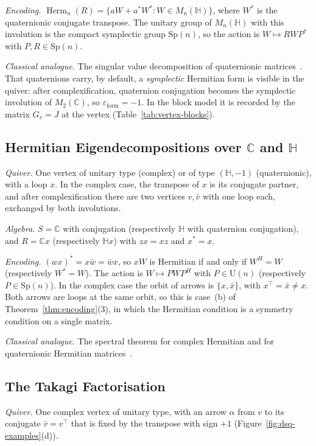 \documentclass[12pt, a4paper]{report}
\theoremstyle{plain}
\theoremstyle{definition}
\theoremstyle{remark}
\theoremstyle{plain}
\newcommand{\epsilonform}{\varepsilon_{\mathrm{form}}}
\newcommand{\CC}{\mathbb{C}}
\newcommand{\HH}{\mathbb{H}}
\newcommand{\Un}{\mathrm{U}}
\newcommand{\Sp}{\mathrm{Sp}}
\newcommand{\Herm}{\operatorname{Herm}}
\begin{document}
\emph{Encoding.} $\Herm_n(R)=\{aW+a^*W^*:W\in M_n(\HH)\}$, where $W^*$ is the quaternionic conjugate transpose. The unitary group of $M_n(\HH)$ with this involution is the compact symplectic group $\Sp(n)$, so the action is $W\mapsto RWP^*$ with $P,R\in\Sp(n)$.

\emph{Classical analogue.} The singular value decomposition of quaternionic matrices~\cite{Zhang1997}. That quaternions carry, by default, a \emph{symplectic} Hermitian form is visible in the quiver: after complexification, quaternion conjugation becomes the symplectic involution of $M_2(\CC)$, so $\epsilonform=-1$. In the block model it is recorded by the matrix $G_v=J$ at the vertex (Table~\ref{tab:vertex-blocks}).

\subsection{Hermitian Eigendecompositions over \texorpdfstring{$\CC$}{C} and \texorpdfstring{$\HH$}{H}}
\label{subsec:cat-hermitian}
\emph{Quiver.} One vertex of unitary type (complex) or of type $(\HH,-1)$ (quaternionic), with a loop $x$. In the complex case, the transpose of $x$ is its conjugate partner, and after complexification there are two vertices $v,\bar v$ with one loop each, exchanged by both involutions.

\emph{Algebra.} $S=\CC$ with conjugation (respectively $\HH$ with quaternion conjugation), and $R=\CC x$ (respectively $\HH x$) with $zx=xz$ and $x^*=x$.

\emph{Encoding.} $(wx)^*=x\bar w=\bar wx$, so $xW$ is Hermitian if and only if $W^H=W$ (respectively $W^*=W$). The action is $W\mapsto PWP^H$ with $P\in\Un(n)$ (respectively $P\in\Sp(n)$). In the complex case the orbit of arrows is $\{x,\bar x\}$, with $x^{\top}=\bar x\neq x$. Both arrows are loops at the same orbit, so this is case~(b) of Theorem~\ref{thm:encoding}(3), in which the Hermitian condition is a symmetry condition on a single matrix.

\emph{Classical analogue.} The spectral theorem for complex Hermitian and for quaternionic Hermitian matrices~\cite{HornJohnson2013,Zhang1997}.
\subsection{The Takagi Factorisation}
\label{subsec:cat-takagi}
\emph{Quiver.} One complex vertex of unitary type, with an arrow $\alpha$ from $v$ to its conjugate $\bar v=v^{\top}$ that is fixed by the transpose with sign $+1$ (Figure~\ref{fig:dsq-examples}(d)).
\end{document}
